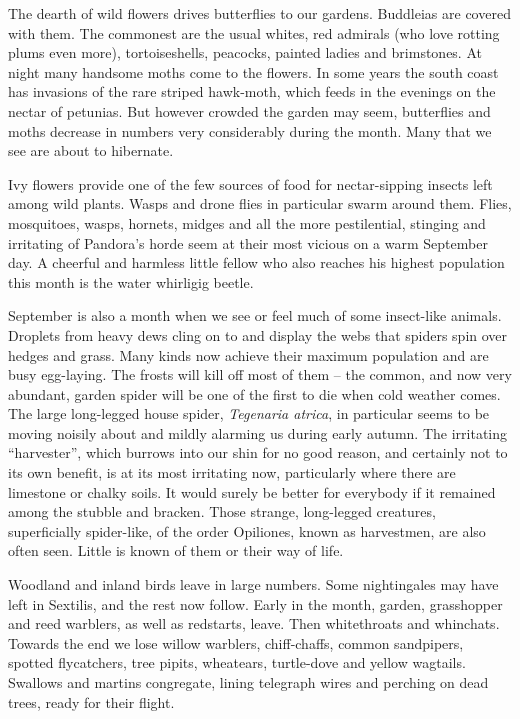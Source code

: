 The dearth of wild flowers drives butterflies to our gardens. Buddleias are covered with them. The commonest are the usual whites, red admirals (who love rotting plums even more), tortoiseshells, peacocks, painted ladies and brimstones. At night many handsome moths come to the flowers. In some years the south coast has invasions of the rare striped hawk-moth, which feeds in the evenings on the nectar of petunias. But however crowded the garden may seem, butterflies and moths decrease in numbers very considerably during the month. Many that we see are about to hibernate.

Ivy flowers provide one of the few sources of food for nectar-sipping insects left among wild plants. Wasps and drone flies in particular swarm around them. Flies, mosquitoes, wasps, hornets, midges and all the more pestilential, stinging and irritating of Pandora's horde seem at their most vicious on a warm September day. A cheerful and harmless little fellow who also reaches his highest population this month is the water whirligig beetle.

September is also a month when we see or feel much of some insect-like animals. Droplets from heavy dews cling on to and display the webs that spiders spin over hedges and grass. Many kinds now achieve their maximum population and are busy egg-laying. The frosts will kill off most of them -- the common, and now very abundant, garden spider will be one of the first to die when cold weather comes. The large long-legged house spider, \emph{Tegenaria atrica}, in particular seems to be moving noisily about and mildly alarming us during early autumn. The irritating ``harvester'', which burrows into our shin for no good reason, and certainly not to its own benefit, is at its most irritating now, particularly where there are limestone or chalky soils. It would surely be better for everybody if it remained among the stubble and bracken. Those strange, long-legged creatures, superficially spider-like, of the order Opiliones, known as harvestmen, are also often seen. Little is known of them or their way of life.

Woodland and inland birds leave in large numbers. Some nightingales may have left in Sextilis, and the rest now follow. Early in the month, garden, grasshopper and reed warblers, as well as redstarts, leave. Then whitethroats and whinchats. Towards the end we lose willow warblers, chiff-chaffs, common sandpipers, spotted flycatchers, tree pipits, wheatears, turtle-dove and yellow wagtails. Swallows and martins congregate, lining telegraph wires and perching on dead trees, ready for their flight.

